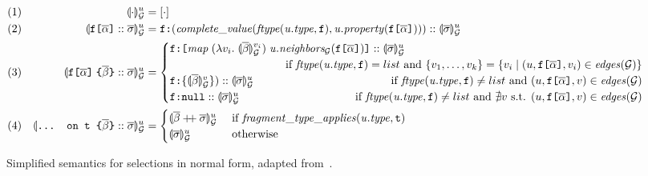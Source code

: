 \begin{figure*}[t]
  \small
  \begin{flushright}
  \end{flushright}
  \centering
    \vspace{-1ex}
    \begin{align*}
    & (1) & \seval{\cdot}{u} &= [\cdot] \\
    & (2) & \sevalu{\fld :: \sset} &= 
    \resp{(\mathit{complete\_value(ftype(u.type, \fkey), u.property(\fld))})} :: \sevalu{\sset} \\
    & (3) & %
    \sevalu{\nfld{\overline{\beta}} :: \sset} &=
    \begin{cases}
      \resp{\texttt{[} \mathit{map}\; (\lambda v_{i}.\; \seval{\overline{\beta}}{v_{i}})\; 
      \mathit{u.neighbors_{\graph}(\fld)} \texttt{]}} :: \sevalu{\sset}  \\
     \hfill \text{ if } 
            \mathit{ftype(u.type, \fkey)} = list \text{ and } \{v_{1}, \ldots, v_{k}\} = 
        \{v_{i} \mid (u, \fld, v_{i}) \in \mathit{edges}(\graph)\} \\
      \resp{\{\seval{\subqueries{\beta}}{v}\})} :: \sevalu{\sset}  
      \hfill \text{ if } 
        \mathit{ftype(u.type, \fkey)}  \neq list \text{ and } (u, \fld, v) \in \mathit{edges}(\graph) \\
      \resp{\nval} :: \sevalu{\sset} 
     \qquad \qquad \qquad \qquad \qquad
    \text{ if } \mathit{ftype(u.type, \fkey)}  \neq list  \text{ and } \nexists v \text{ s.t. }  (u, \fld, v) \in \mathit{edges}(\graph) \\
    \end{cases}\\
    & (4) & \sevalu{\ifrag{t}{\overline{\beta}}:: \sset} &= \begin{cases}
    \sevalu{\overline{\beta} \mdoubleplus \sset} & 
  	\text{ if }\mathit{fragment\_type\_applies (u.type, \texttt{t})}\\
    \sevalu{\sset} & \text{ otherwise}
    \end{cases}
    \end{align*}
    \caption{Simplified semantics for selections in normal form,
      adapted from~\cite{gqlph}.} 
    \label{fig:simpl_semantics}
\end{figure*}




